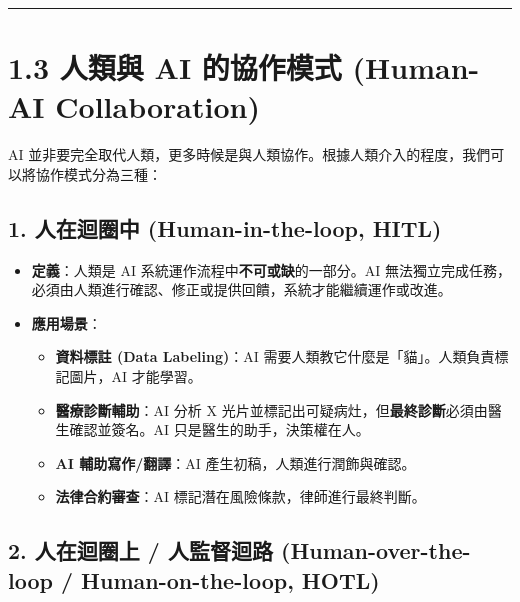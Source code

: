 \documentclass[
  letterpaper,
  DIV=11,
  numbers=noendperiod]{scrreprt}
\providecommand{\tightlist}{%
  \setlength{\itemsep}{0pt}\setlength{\parskip}{0pt}}
\begin{document}
\begin{center}\rule{0.5\linewidth}{0.5pt}\end{center}

\chapter{1.3 人類與 AI 的協作模式 (Human-AI
Collaboration)}\label{sec-human-ai-collab}

AI
並非要完全取代人類，更多時候是與人類協作。根據人類介入的程度，我們可以將協作模式分為三種：

\section{1. 人在迴圈中 (Human-in-the-loop, HITL)}\label{sec-hitl}

\begin{itemize}
\tightlist
\item
  \textbf{定義}：人類是 AI 系統運作流程中\textbf{不可或缺}的一部分。AI
  無法獨立完成任務，必須由人類進行確認、修正或提供回饋，系統才能繼續運作或改進。
\item
  \textbf{應用場景}：

  \begin{itemize}
  \tightlist
  \item
    \textbf{資料標註 (Data Labeling)}：AI
    需要人類教它什麼是「貓」。人類負責標記圖片，AI 才能學習。
  \item
    \textbf{醫療診斷輔助}：AI 分析 X
    光片並標記出可疑病灶，但\textbf{最終診斷}必須由醫生確認並簽名。AI
    只是醫生的助手，決策權在人。
  \item
    \textbf{AI 輔助寫作/翻譯}：AI 產生初稿，人類進行潤飾與確認。
  \item
    \textbf{法律合約審查}：AI 標記潛在風險條款，律師進行最終判斷。
  \end{itemize}
\end{itemize}

\section{2. 人在迴圈上 / 人監督迴路 (Human-over-the-loop /
Human-on-the-loop, HOTL)}\label{sec-hotl}
\end{document}
